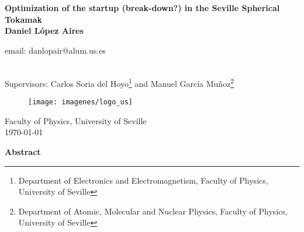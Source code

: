 \documentclass[a4paper,12pt,oneside]{book}
\begin{document}
\thispagestyle{empty}




\begin{center}


\textbf{\huge Optimization of the startup (break-down?) in the Seville Spherical Tokamak} \\
%
\vspace{3cm}
\textbf{\Large Daniel López Aires} \\
\begin{large}

email: danlopair@alum.us.es\end{large} \\
\vspace{.3cm}
Supervisors: Carlos Soria del Hoyo\footnote{Department of Electronics and Electromagnetism, Faculty of Physics, University of Seville} and Manuel García Muñoz\footnote{Department of Atomic, Molecular and Nuclear Physics, Faculty of Physics, University of Seville}\\
%
%
\vfill

\begin{figure}[htbp]
\centering
\texttt{[image: imagenes/logo\_us]}
\end{figure}

\vfill

Faculty of Physics, University of Seville \\
\today \\

%
%
%
\end{center}
%

\newpage\null
\thispagestyle{empty}

%
\newpage


\begin{center}
\begin{large}
\textbf{Abstract}
\end{large}

\end{center}

\end{document}
